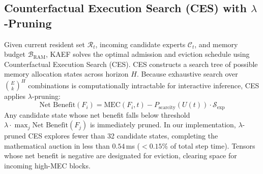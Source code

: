 \subsection{Counterfactual Execution Search (CES) with $\lambda$-Pruning}
Given current resident set $\mathcal{R}_t$, incoming candidate experts $\mathcal{C}_t$, and memory budget $\mathcal{B}_{\text{RAM}}$, KAEF solves the optimal admission and eviction schedule using Counterfactual Execution Search (CES).
CES constructs a search tree of possible memory allocation states across horizon $H$. Because exhaustive search over $\binom{E}{k}^H$ combinations is computationally intractable for interactive inference, CES applies $\lambda$-pruning:
\begin{equation}
    \text{Net Benefit}(F_i) = \text{MEC}\left(F_i, t\right) - P_{\text{scarcity}}(U(t)) \cdot \mathcal{S}_{\text{exp}}
\end{equation}
Any candidate state whose net benefit falls below threshold $\lambda \cdot \max_{j} \text{Net Benefit}(F_j)$ is immediately pruned. In our implementation, $\lambda$-pruned CES explores fewer than 32 candidate states, completing the mathematical auction in less than $0.54$\,ms ($<0.15\%$ of total step time).
Tensors whose net benefit is negative are designated for eviction, clearing space for incoming high-MEC blocks.
